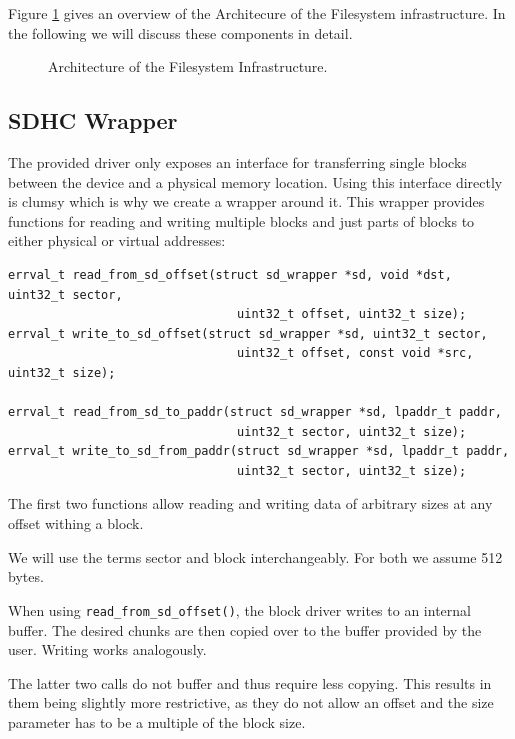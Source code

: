 Figure \ref{fig:fs_arch} gives an overview of the Architecure of the Filesystem
infrastructure.
In the following we will discuss these components in detail.

\begin{figure}[ht]
    \centering
    \scalebox{0.6}{ }
    \caption{Architecture of the Filesystem Infrastructure.}
    \label{fig:fs_arch}
\end{figure}


\subsection{SDHC Wrapper}

The provided driver only exposes an interface for transferring single blocks between the device and a physical memory location.
Using this interface directly is clumsy which is why we create a wrapper around it. 
This wrapper provides functions for reading and writing multiple blocks and just parts of blocks to either physical or virtual addresses:

\begin{verbatim}
errval_t read_from_sd_offset(struct sd_wrapper *sd, void *dst, uint32_t sector, 
                                uint32_t offset, uint32_t size);
errval_t write_to_sd_offset(struct sd_wrapper *sd, uint32_t sector, 
                                uint32_t offset, const void *src, uint32_t size);

errval_t read_from_sd_to_paddr(struct sd_wrapper *sd, lpaddr_t paddr, 
                                uint32_t sector, uint32_t size);
errval_t write_to_sd_from_paddr(struct sd_wrapper *sd, lpaddr_t paddr, 
                                uint32_t sector, uint32_t size);
\end{verbatim}

The first two functions allow reading and writing data of arbitrary sizes at any offset withing a block.

We will use the terms sector and block interchangeably. For both we assume 512 bytes.

When using \texttt{read_from_sd_offset()}, the block driver writes to an internal buffer. 
The desired chunks are then copied over to the buffer provided by the user.
Writing works analogously.

The latter two calls do not buffer and thus require less copying. 
This results in them being slightly more restrictive, as they do not allow an offset and the size parameter has to be a multiple of the block size.


